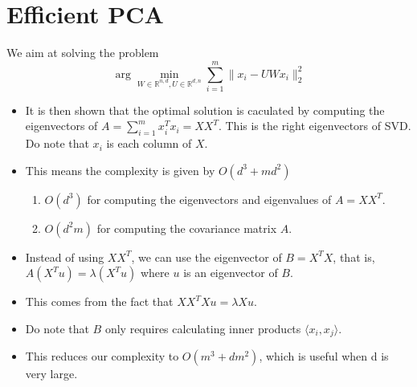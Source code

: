 \documentclass[11pt,reqno]{amsart}
\theoremstyle{remark}
\begin{document}
\begin{sloppypar}
\section{Efficient PCA}
We aim at solving the problem 
\[
\arg\min_{W\in\mathbb{R}^{n,d}, U\in\mathbb{R}^{d,n}}\sum^m_{i=1}\lVert x_i-UWx_i\rVert^2_2
\]
\begin{itemize}
\item It is then shown that the optimal solution is caculated by computing the eigenvectors of $A=\sum^m_{i=1}x_i^Tx_i=XX^T$. 
This is the right eigenvectors of SVD. Do note that $x_i$ is each column of $X$.
\item This means the complexity is given by $O(d^3+md^2)$
\begin{enumerate}
\item $O(d^3)$ for computing the eigenvectors and eigenvalues of $A=XX^T$.
\item $O(d^2 m)$ for computing the covariance matrix $A$.
\end{enumerate}
\item Instead of using $XX^T$, we can use the eigenvector of $B=X^TX$, that is, 
$A(X^Tu)=\lambda(X^T u)$ where $u$ is an eigenvector of $B$.
\item This comes from the fact that $X X^TX u=\lambda X u$.
\item Do note that $B$ only requires calculating inner products $\langle x_i,x_j\rangle$.
\item This reduces our complexity to $O(m^3+dm^2)$, which is useful when d is very large.
\end{itemize}


\end{sloppypar}
\end{document}
